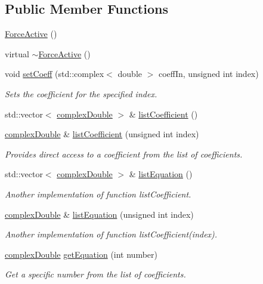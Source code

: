 \subsection*{Public Member Functions}
\begin{DoxyCompactItemize}
\item 
\hyperlink{classosea_1_1ofreq_1_1_force_active_ae006e3394f8c925c6a3218686c5cc8ae}{Force\-Active} ()
\item 
virtual \hyperlink{classosea_1_1ofreq_1_1_force_active_aa2db4bc1fb74ecb6e0ee46c59a40dd2a}{$\sim$\-Force\-Active} ()
\item 
void \hyperlink{classosea_1_1ofreq_1_1_force_active_a5b3f88bb50924c41766a234dd3fb988e}{set\-Coeff} (std\-::complex$<$ double $>$ coeff\-In, unsigned int index)
\begin{DoxyCompactList}\small\item\em Sets the coefficient for the specified index. \end{DoxyCompactList}\item 
std\-::vector$<$ \hyperlink{namespaceosea_1_1ofreq_a40cad4695a41123a7ae6ab0b6e8b1664}{complex\-Double} $>$ \& \hyperlink{classosea_1_1ofreq_1_1_force_active_a6cc1157859625b457b82ff745f0b5ff4}{list\-Coefficient} ()
\item 
\hyperlink{namespaceosea_1_1ofreq_a40cad4695a41123a7ae6ab0b6e8b1664}{complex\-Double} \& \hyperlink{classosea_1_1ofreq_1_1_force_active_aac0948404f2f21b013b9a02b38087191}{list\-Coefficient} (unsigned int index)
\begin{DoxyCompactList}\small\item\em Provides direct access to a coefficient from the list of coefficients. \end{DoxyCompactList}\item 
std\-::vector$<$ \hyperlink{namespaceosea_1_1ofreq_a40cad4695a41123a7ae6ab0b6e8b1664}{complex\-Double} $>$ \& \hyperlink{classosea_1_1ofreq_1_1_force_active_a931628f3a5c5d9b142726697a96e1407}{list\-Equation} ()
\begin{DoxyCompactList}\small\item\em Another implementation of function list\-Coefficient. \end{DoxyCompactList}\item 
\hyperlink{namespaceosea_1_1ofreq_a40cad4695a41123a7ae6ab0b6e8b1664}{complex\-Double} \& \hyperlink{classosea_1_1ofreq_1_1_force_active_a573a98979938dd6bfbaf5d40ae17a058}{list\-Equation} (unsigned int index)
\begin{DoxyCompactList}\small\item\em Another implementation of function list\-Coefficient(index). \end{DoxyCompactList}\item 
\hyperlink{namespaceosea_1_1ofreq_a40cad4695a41123a7ae6ab0b6e8b1664}{complex\-Double} \hyperlink{classosea_1_1ofreq_1_1_force_active_a2e01f54c3071d2f8831fb7763cf14500}{get\-Equation} (int number)
\begin{DoxyCompactList}\small\item\em Get a specific number from the list of coefficients. \end{DoxyCompactList}\end{DoxyCompactItemize}
